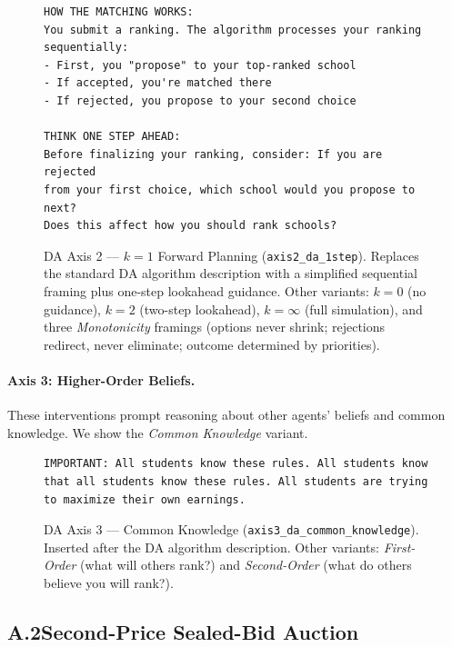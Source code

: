 \begin{figure}[H]
\begin{lstlisting}
HOW THE MATCHING WORKS:
You submit a ranking. The algorithm processes your ranking
sequentially:
- First, you "propose" to your top-ranked school
- If accepted, you're matched there
- If rejected, you propose to your second choice

THINK ONE STEP AHEAD:
Before finalizing your ranking, consider: If you are rejected
from your first choice, which school would you propose to next?
Does this affect how you should rank schools?
\end{lstlisting}
\caption{DA Axis 2 --- $k{=}1$ Forward Planning (\texttt{axis2\_da\_1step}). Replaces the standard DA algorithm description with a simplified sequential framing plus one-step lookahead guidance. Other variants: $k{=}0$ (no guidance), $k{=}2$ (two-step lookahead), $k{=}\infty$ (full simulation), and three \emph{Monotonicity} framings (options never shrink; rejections redirect, never eliminate; outcome determined by priorities).}
\label{fig:da-axis2-1step}
\end{figure}

\paragraph{Axis 3: Higher-Order Beliefs.}
These interventions prompt reasoning about other agents' beliefs and common knowledge. We show the \emph{Common Knowledge} variant.

\begin{figure}[H]
\begin{lstlisting}
IMPORTANT: All students know these rules. All students know
that all students know these rules. All students are trying
to maximize their own earnings.
\end{lstlisting}
\caption{DA Axis 3 --- Common Knowledge (\texttt{axis3\_da\_common\_knowledge}). Inserted after the DA algorithm description. Other variants: \emph{First-Order} (what will others rank?) and \emph{Second-Order} (what do others believe you will rank?).}
\label{fig:da-axis3-common-knowledge}
\end{figure}


\newpage
\subsection*{A.2\quad Second-Price Sealed-Bid Auction}

